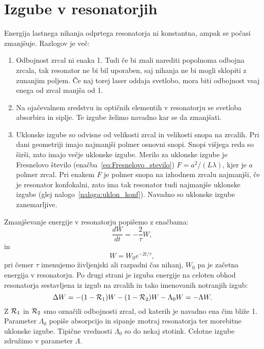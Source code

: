 \section{Izgube v resonatorjih}
Energija lastnega nihanja odprtega resonatorja ni konstantna, ampak se počasi
zmanjšuje. Razlogov je več:
\begin{enumerate}
\item Odbojnost zrcal ni enaka 1. Tudi če bi znali narediti popolnoma odbojna zrcala, 
tak resonator ne bi bil uporaben, saj nihanja ne bi mogli sklopiti z zunanjim poljem. Če 
naj torej laser oddaja svetlobo, mora biti odbojnost vsaj enega od zrcal manjša od 1.
\item Na ojačevalnem sredstvu in optičnih elementih v resonatorju se svetloba absorbira in siplje. 
Te izgube želimo navadno kar se da zmanjšati.
\item Uklonske izgube so odvisne od velikosti zrcal in velikosti snopa na zrcalih.
Pri dani geometriji imajo najmanjši polmer osnovni snopi. Snopi višjega
reda so širši, zato imajo večje uklonske izgube. Merilo za uklonske
izgube je Fresnelovo število (enačba~\ref{eq:Fresnelovo_stevilo}) 
$F=a^{2}/(L\lambda)$, kjer je $a$ polmer zrcal. Pri enakem $F$ je
polmer snopa na izhodnem zrcalu najmanjši, če je resonator konfokalni, 
zato ima tak resonator tudi najmanjše uklonske izgube (glej nalogo~\ref{naloga:uklon_konf}).
Navadno so uklonske izgube zanemarljive. 
\end{enumerate}

Zmanjševanje energije v resonatorju popišemo z enačbama:
\begin{equation}
\frac{dW}{dt}=-\frac{2}{\tau}W,
\label{eq:dW}
\end{equation}
in 
\begin{equation}
W = W_0 e^{-2t/\tau},
\label{eq:dW1}
\end{equation}
pri čemer $\tau$ imenujemo življenjski ali razpadni čas nihanj, 
$W_0$ pa je začetna energija v resonatorju.
Po drugi strani je izguba energije na celoten obhod resonatorja 
sestavljena iz izgub na zrcalih in tako imenovanih notranjih izgub:
\begin{equation}
\Delta W = -(1-{\cal R}_{1})W-(1-{\cal R}_{2})W -\Lambda_{0} W = -\Lambda W.
\label{eq:Lambda}
\end{equation}
Z ${\cal R}_{1}$ in ${\cal R}_{2}$ smo označili odbojnosti zrcal, od katerih je navadno ena
čim bliže 1. Parameter $\Lambda_{0}$ popiše absorpcijo in
sipanje znotraj resonatorja ter morebitne uklonske izgube. Tipične vrednosti 
$\Lambda_0$ so do nekaj stotink. Celotne izgube združimo v parameter $\Lambda$. 

